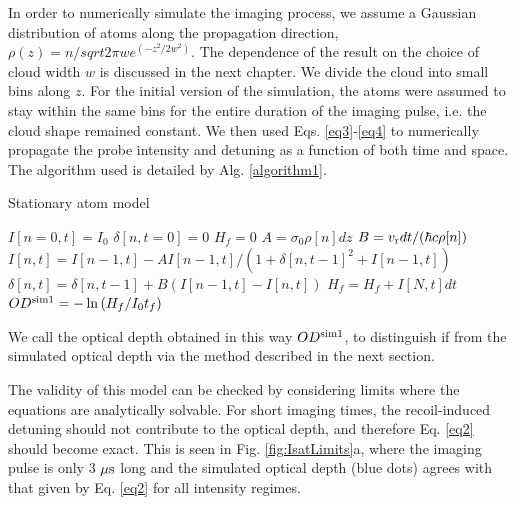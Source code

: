 In order to numerically simulate the imaging process, we assume a Gaussian distribution of atoms along the propagation direction, $\rho(z) = n/sqrt{2\pi}w e^(-z^2/2w^2)$. The dependence of the result on the choice of cloud  width $w$ is discussed in the next chapter. We divide the cloud into small bins along $z$. For the initial version of the simulation, the atoms were assumed to stay within the same bins for the entire duration of the imaging pulse, i.e. the cloud shape remained constant. We then used Eqs. \ref{eq3}-\ref{eq4} to numerically propagate the probe intensity and detuning as a function of both time and space. The algorithm used is detailed by Alg. \ref{algorithm1}.
%

\begin{algorithm}
\caption{Stationary atom model}
\label{algorithm1}
\begin{algorithmic}
\STATE $I[n=0,t]=I_0$ 
\STATE $\delta[n, t=0]=0$ 
\STATE $H_f=0$ 
 \STATE $A=\sigma_0\rho[n] dz$ 
 \STATE $B=v_{\rm{r}} dt/(\hbar c \rho[n])$  
\STATE $I[n,t]=I[n-1,t] - A I[n-1,t]/(1+\delta[n,t-1]^2+I[n-1,t])$  
\STATE $\delta[n,t]=\delta[n,t-1]+B\left(I[n-1,t]-I[n,t]\right)$  
\ENDFOR
\STATE $H_f =H_f+ I[N,t]dt$ 
\ENDFOR
\STATE $OD^{\rm{sim1}}=-\ln{(H_f/I_0t_f)}$
\end{algorithmic}
\end{algorithm}

We call the optical depth obtained in this way $OD^{\rm{sim1}}$, to distinguish if from the simulated optical depth via the method described in the next section. 

The validity of this model can be checked by considering limits where the equations are analytically solvable. For short imaging times, the recoil-induced detuning should not contribute to the optical depth, and therefore Eq. \ref{eq2} should become exact. This is seen in Fig. \ref{fig:IsatLimits}a, where the imaging pulse is only 3 $\mu \rm{s}$ long and the simulated optical depth (blue dots) agrees with that given by Eq. \ref{eq2} for all intensity regimes.  

